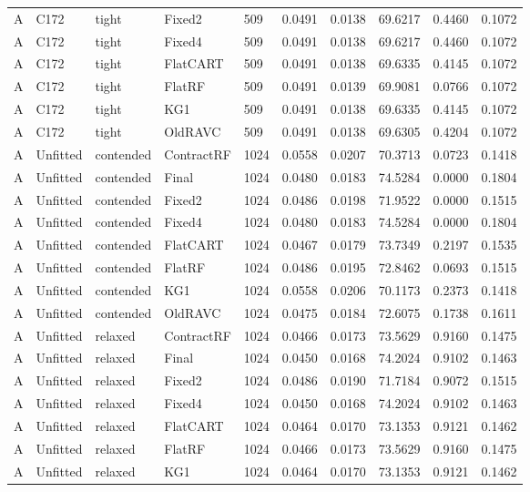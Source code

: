 \begin{longtable}{@{}llllllllll@{}}
A & C172 & tight & Fixed2 & 509 & 0.0491 & 0.0138 & 69.6217 & 0.4460 & 0.1072\\
A & C172 & tight & Fixed4 & 509 & 0.0491 & 0.0138 & 69.6217 & 0.4460 & 0.1072\\
A & C172 & tight & FlatCART & 509 & 0.0491 & 0.0138 & 69.6335 & 0.4145 & 0.1072\\
A & C172 & tight & FlatRF & 509 & 0.0491 & 0.0139 & 69.9081 & 0.0766 & 0.1072\\
A & C172 & tight & KG1 & 509 & 0.0491 & 0.0138 & 69.6335 & 0.4145 & 0.1072\\
A & C172 & tight & OldRAVC & 509 & 0.0491 & 0.0138 & 69.6305 & 0.4204 & 0.1072\\
A & Unfitted & contended & ContractRF & 1024 & 0.0558 & 0.0207 & 70.3713 & 0.0723 & 0.1418\\
A & Unfitted & contended & Final & 1024 & 0.0480 & 0.0183 & 74.5284 & 0.0000 & 0.1804\\
A & Unfitted & contended & Fixed2 & 1024 & 0.0486 & 0.0198 & 71.9522 & 0.0000 & 0.1515\\
A & Unfitted & contended & Fixed4 & 1024 & 0.0480 & 0.0183 & 74.5284 & 0.0000 & 0.1804\\
A & Unfitted & contended & FlatCART & 1024 & 0.0467 & 0.0179 & 73.7349 & 0.2197 & 0.1535\\
A & Unfitted & contended & FlatRF & 1024 & 0.0486 & 0.0195 & 72.8462 & 0.0693 & 0.1515\\
A & Unfitted & contended & KG1 & 1024 & 0.0558 & 0.0206 & 70.1173 & 0.2373 & 0.1418\\
A & Unfitted & contended & OldRAVC & 1024 & 0.0475 & 0.0184 & 72.6075 & 0.1738 & 0.1611\\
A & Unfitted & relaxed & ContractRF & 1024 & 0.0466 & 0.0173 & 73.5629 & 0.9160 & 0.1475\\
A & Unfitted & relaxed & Final & 1024 & 0.0450 & 0.0168 & 74.2024 & 0.9102 & 0.1463\\
A & Unfitted & relaxed & Fixed2 & 1024 & 0.0486 & 0.0190 & 71.7184 & 0.9072 & 0.1515\\
A & Unfitted & relaxed & Fixed4 & 1024 & 0.0450 & 0.0168 & 74.2024 & 0.9102 & 0.1463\\
A & Unfitted & relaxed & FlatCART & 1024 & 0.0464 & 0.0170 & 73.1353 & 0.9121 & 0.1462\\
A & Unfitted & relaxed & FlatRF & 1024 & 0.0466 & 0.0173 & 73.5629 & 0.9160 & 0.1475\\
A & Unfitted & relaxed & KG1 & 1024 & 0.0464 & 0.0170 & 73.1353 & 0.9121 & 0.1462\\

\end{longtable}
